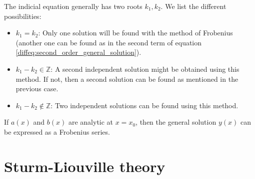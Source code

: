     \begin{property}
        The indicial equation generally has two roots $k_1, k_2$. We list the different possibilities:
        \begin{itemize}
            \item $k_1 = k_2$: Only one solution will be found with the method of Frobenius (another one can be found as in the second term of equation \ref{diffeq:second_order_general_solution}).
            \item $k_1 - k_2 \in\mathbb{Z}$: A second independent solution might be obtained using this method. If not, then a second solution can be found as mentioned in the previous case.
            \item $k_1 - k_2 \not\in\mathbb{Z}$: Two independent solutions can be found using this method.
        \end{itemize}
    \end{property}

    \begin{theorem}[Fuchs]
        If $a(x)$ and $b(x)$ are analytic at $x=x_0$, then the general solution $y(x)$ can be expressed as a Frobenius series.
    \end{theorem}

\section{Sturm-Liouville theory}


